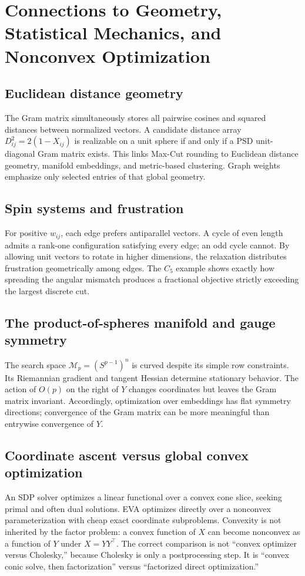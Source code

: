 \chapter{Connections to Geometry, Statistical Mechanics, and Nonconvex Optimization}\label{ch:connections}
\section{Euclidean distance geometry}
The Gram matrix simultaneously stores all pairwise cosines and squared distances between normalized vectors. A candidate distance array $D_{ij}^2=2(1-X_{ij})$ is realizable on a unit sphere if and only if a PSD unit-diagonal Gram matrix exists. This links Max-Cut rounding to Euclidean distance geometry, manifold embeddings, and metric-based clustering. Graph weights emphasize only selected entries of that global geometry.

\section{Spin systems and frustration}
For positive $w_{ij}$, each edge prefers antiparallel vectors. A cycle of even length admits a rank-one configuration satisfying every edge; an odd cycle cannot. By allowing unit vectors to rotate in higher dimensions, the relaxation distributes frustration geometrically among edges. The $C_5$ example shows exactly how spreading the angular mismatch produces a fractional objective strictly exceeding the largest discrete cut.

\section{The product-of-spheres manifold and gauge symmetry}
The search space $\mathcal M_p=(S^{p-1})^n$ is curved despite its simple row constraints. Its Riemannian gradient and tangent Hessian determine stationary behavior. The action of $O(p)$ on the right of $Y$ changes coordinates but leaves the Gram matrix invariant. Accordingly, optimization over embeddings has flat symmetry directions; convergence of the Gram matrix can be more meaningful than entrywise convergence of $Y$.

\section{Coordinate ascent versus global convex optimization}
An SDP solver optimizes a linear functional over a convex cone slice, seeking primal and often dual solutions. EVA optimizes directly over a nonconvex parameterization with cheap exact coordinate subproblems. Convexity is not inherited by the factor problem: a convex function of $X$ can become nonconvex as a function of $Y$ under $X=YY^\top$. The correct comparison is not ``convex optimizer versus Cholesky,'' because Cholesky is only a postprocessing step. It is ``convex conic solve, then factorization'' versus ``factorized direct optimization.''

